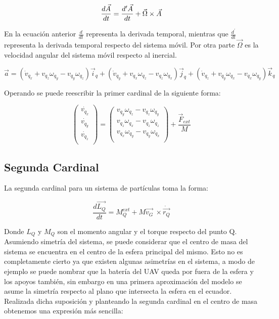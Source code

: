 \documentclass[main]{subfiles}
\begin{document}
\begin{equation}
\frac{d\vec{A}}{dt} =\frac{d^\prime\vec{A}}{dt}+\vec{\Omega}\times\vec{A} \\
\end{equation}

En la ecuaci\'on anterior $\frac{d}{dt}$ representa la derivada temporal, mientras que $\frac{d^\prime}{dt}$ representa la derivada temporal respecto del sistema m\'ovil. Por otra parte $\vec{\Omega}$ es la velocidad angular del sistema m\'ovil respecto al inercial. 

\begin{equation}
\vec{a} = (\dot{v}_{q_x}+v_{q_z} \omega_{q_y} - v_{q_y} \omega_{q_z} )\vec{i}_q + (\dot{v}_{q_y}+v_{q_x} \omega_{q_z} - v_{q_z} \omega_{q_x} )\vec{j}_q+(\dot{v}_{q_z}+v_{q_y} \omega_{q_x} - v_{q_x} \omega_{q_y} )\vec{k}_q
\end{equation}


Operando se puede reescribir la primer cardinal de la siguiente forma:

\begin{equation}
\left(\begin{array}{c}\dot{v_{q_x}}\\
\dot{v_{q_y}}\\
\dot{v_{q_z}}\\
\end{array} \right) = \left(\begin{array}{c}
v_{q_y} \omega_{q_z} - v_{q_z} \omega_{q_y}	\\
v_{q_z} \omega_{q_x} - v_{q_z} \omega_{q_z}\\
v_{q_x} \omega_{q_y} - v_{q_y} \omega_{q_x}\\
\end{array}\right) + \frac{\vec{F}_{ext} }{M}
\label{eq:vpuntos}
\end{equation}


\subsection{Segunda Cardinal}

La segunda cardinal para un sistema de part\'iculas toma la forma:

\begin{equation}
\frac{d\vec{L_Q}}{dt} =M_Q^{ext}+M\vec{v_G}\ \times \dot{\vec{r_Q}} 
\end{equation}

Donde $L_Q$ y $M_Q$ son el momento angular y el torque respecto del punto Q.
Asumiendo simetr\'ia del sistema, se puede considerar que el centro de masa del sistema se encuentra en el centro de la esfera principal del mismo. Esto no es completamente cierto ya que existen algunas asimetr\'ias en el sistema, a modo de ejemplo se puede nombrar que la bater\'ia del UAV queda por fuera de la esfera y los apoyos tambi\'en, sin embargo en una primera aproximaci\'on del modelo se asume la simetr\'ia respecto al plano que intersecta la esfera en el ecuador. Realizada dicha suposici\'on y planteando la segunda cardinal en el centro de masa obtenemos una expresi\'on m\'as sencilla:
\end{document}
